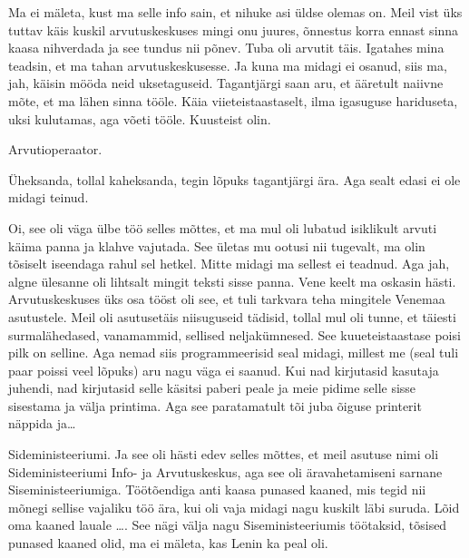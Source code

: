 
Ma ei mäleta, kust ma selle info sain, et nihuke asi üldse olemas on. Meil vist üks tuttav käis kuskil arvutuskeskuses  mingi onu juures, õnnestus korra ennast sinna kaasa nihverdada ja see tundus nii põnev. Tuba oli arvutit täis. Igatahes mina teadsin, et ma tahan arvutuskeskusesse. Ja kuna ma midagi ei osanud, siis ma, jah, käisin mööda neid uksetaguseid. Tagantjärgi saan aru, et ääretult naiivne mõte, et ma lähen sinna tööle. Käia viieteistaastaselt, ilma igasuguse hariduseta, uksi kulutamas, aga võeti tööle. Kuusteist olin.


Arvutioperaator. 


Üheksanda, tollal kaheksanda, tegin lõpuks tagantjärgi ära. Aga sealt edasi ei ole midagi teinud. 


Oi, see oli väga ülbe töö selles mõttes, et ma mul oli lubatud isiklikult arvuti käima panna ja klahve vajutada. See ületas mu ootusi nii tugevalt, ma olin tõsiselt iseendaga rahul sel hetkel. Mitte midagi ma sellest ei teadnud. Aga jah, algne ülesanne oli lihtsalt mingit teksti sisse panna. Vene keelt ma oskasin hästi. Arvutuskeskuses üks osa tööst oli see, et tuli tarkvara teha mingitele Venemaa asutustele. Meil oli asutusetäis niisuguseid tädisid, tollal mul oli tunne, et täiesti surmalähedased, vanamammid, sellised neljakümnesed. See kuueteistaastase poisi pilk on selline. Aga nemad siis programmeerisid seal midagi, millest me (seal tuli paar poissi veel lõpuks) aru nagu väga ei saanud. Kui nad kirjutasid kasutaja juhendi, nad kirjutasid selle käsitsi paberi peale ja meie pidime selle sisse sisestama ja välja printima. Aga see paratamatult tõi juba õiguse printerit näppida ja\ldots


Sideministeeriumi. Ja see oli hästi edev selles mõttes, et meil asutuse nimi oli Sideministeeriumi Info- ja Arvutuskeskus, aga see oli äravahetamiseni sarnane Siseministeeriumiga. Töötõendiga anti kaasa punased kaaned, mis tegid nii mõnegi sellise vajaliku töö ära, kui oli vaja midagi nagu kuskilt läbi suruda. Lõid oma kaaned lauale \ldots. See nägi välja nagu Siseministeeriumis töötaksid, tõsised punased kaaned olid, ma ei mäleta, kas Lenin ka peal oli. 

